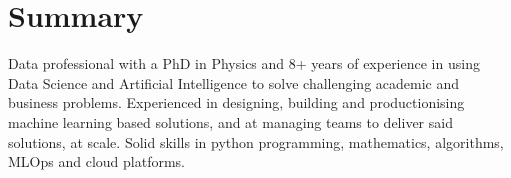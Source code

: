 \documentclass[10pt,a4paper,sans]{moderncv}        %
\begin{document}
\makecvtitle


\section{Summary}
Data professional with a PhD in Physics and 8+ years of experience in using Data Science and Artificial Intelligence to solve challenging academic and business problems.\newline{}
Experienced in designing, building and productionising machine learning based solutions, and at managing teams to deliver said solutions, at scale.\newline{}
Solid skills in python programming, mathematics, algorithms, MLOps and cloud platforms.
\end{document}
